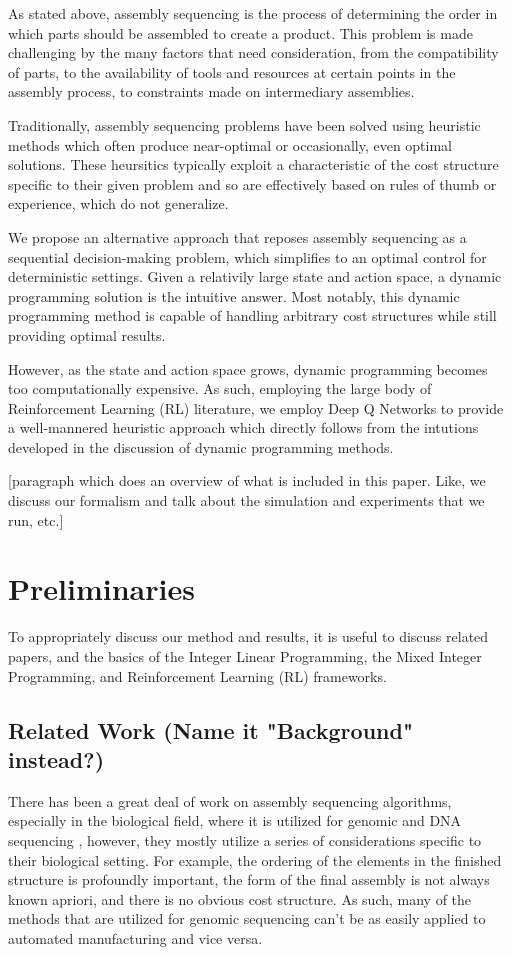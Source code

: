 \documentclass{article}
\begin{document}
As stated above, assembly sequencing is the process of determining the order in which parts should be assembled to create a product. This problem is made challenging by the many factors that need consideration, from the compatibility of parts, to the availability of tools and resources at certain points in the assembly process, to constraints made on intermediary assemblies.

Traditionally, assembly sequencing problems have been solved using heuristic methods which often produce near-optimal or occasionally, even optimal solutions. These heursitics typically exploit a characteristic of the cost structure specific to their given problem and so are effectively based on rules of thumb or experience, which do not generalize.

We propose an alternative approach that reposes assembly sequencing as a sequential decision-making problem, which simplifies to an optimal control for deterministic settings.
Given a relativily large state and action space, a dynamic programming solution is the intuitive answer. Most notably, this dynamic programming method is capable of handling arbitrary cost structures while still providing optimal results. 

However, as the state and action space grows, dynamic programming becomes too computationally expensive. As such, employing the large body of Reinforcement Learning (RL) literature, we employ Deep Q Networks to provide a well-mannered heuristic approach which directly follows from the intutions developed in the discussion of dynamic programming methods. 

\color{red}
[paragraph which does an overview of what is included in this paper. Like, we discuss our formalism and talk about the simulation and experiments that we run, etc.]
\color{black}


\section{Preliminaries}
To appropriately discuss our method and results, it is useful to discuss related papers, and the basics of the Integer Linear Programming, the Mixed Integer Programming, and Reinforcement Learning (RL) frameworks.

\subsection{Related Work (Name it "Background" instead?)}
There has been a great deal of work on assembly sequencing algorithms, especially in the biological field, where it is utilized for genomic and DNA sequencing \citep{Miller2010}\citep{Dohm2007}\citep{WarnkeSommer2016}, however, they mostly utilize a series of considerations specific to their biological setting. For example, the ordering of the elements in the finished structure is profoundly important, the form of the final assembly is not always known apriori, and there is no obvious cost structure. As such, many of the methods that are utilized for genomic sequencing can't be as easily applied to automated manufacturing and vice versa.
\end{document}
